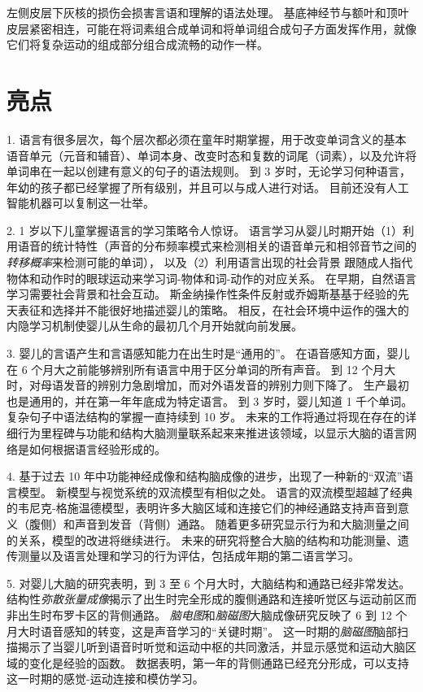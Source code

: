 左侧皮层下灰核的损伤会损害言语和理解的语法处理。
基底神经节与额叶和顶叶皮层紧密相连，可能在将词素组合成单词和将单词组合成句子方面发挥作用，就像它们将复杂运动的组成部分组合成流畅的动作一样。



\section{亮点}

1. 语言有很多层次，每个层次都必须在童年时期掌握，用于改变单词含义的基本语音单元（元音和辅音）、单词本身、改变时态和复数的词尾（词素），以及允许将单词串在一起以创建有意义的句子的语法规则。
到 3 岁时，无论学习何种语言，年幼的孩子都已经掌握了所有级别，并且可以与成人进行对话。
目前还没有人工智能机器可以复制这一壮举。 


2. 1 岁以下儿童掌握语言的学习策略令人惊讶。
语言学习从婴儿时期开始（1）利用语音的统计特性（声音的分布频率模式来检测相关的语音单元和相邻音节之间的\textit{转移概率}来检测可能的单词），
以及（2）利用语言出现的社会背景 跟随成人指代物体和动作时的眼球运动来学习词-物体和词-动作的对应关系。
在早期，自然语言学习需要社会背景和社会互动。
斯金纳操作性条件反射或乔姆斯基基于经验的先天表征和选择并不能很好地描述婴儿的策略。
相反，在社会环境中运作的强大的内隐学习机制使婴儿从生命的最初几个月开始就向前发展。


3. 婴儿的言语产生和言语感知能力在出生时是“通用的”。
在语音感知方面，婴儿在 6 个月大之前能够辨别所有语言中用于区分单词的所有声音。
到 12 个月大时，对母语发音的辨别力急剧增加，而对外语发音的辨别力则下降了。
生产最初也是通用的，并在第一年年底成为特定语言。
到 3 岁时，婴儿知道 1 千个单词。
复杂句子中语法结构的掌握一直持续到 10 岁。
未来的工作将通过将现在存在的详细行为里程碑与功能和结构大脑测量联系起来来推进该领域，以显示大脑的语言网络是如何根据语言经验形成的。 


4. 基于过去 10 年中功能神经成像和结构脑成像的进步，出现了一种新的“双流”语言模型。
新模型与视觉系统的双流模型有相似之处。
语言的双流模型超越了经典的韦尼克-格施温德模型，表明许多大脑区域和连接它们的神经通路支持声音到意义（腹侧）和声音到发音（背侧）通路。
随着更多研究显示行为和大脑测量之间的关系，模型的改进将继续进行。
未来的研究将整合大脑的结构和功能测量、遗传测量以及语言处理和学习的行为评估，包括成年期的第二语言学习。


5. 对婴儿大脑的研究表明，到 3 至 6 个月大时，大脑结构和通路已经非常发达。
结构性\textit{弥散张量成像}揭示了出生时完全形成的腹侧通路和连接听觉区与运动前区而非出生时布罗卡区的背侧通路。
\textit{脑电图}和\textit{脑磁图}大脑成像研究反映了 6 到 12 个月大时语音感知的转变，这是声音学习的“关键时期”。
这一时期的\textit{脑磁图}脑部扫描揭示了当婴儿听到语音时听觉和运动中枢的共同激活，并显示感觉和运动大脑区域的变化是经验的函数。
数据表明，第一年的背侧通路已经充分形成，可以支持这一时期的感觉-运动连接和模仿学习。


